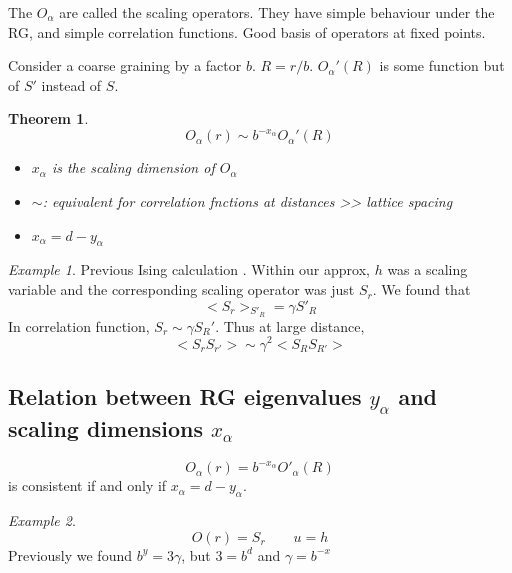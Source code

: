\documentclass[a4paper]{book}
\newtheorem{theorem}{Theorem}[section]
\theoremstyle{definition}
\theoremstyle{remark}
\newtheorem*{example}{Example}
\begin{document}
The $O_\alpha$ are called the scaling operators. They have simple behaviour under the RG, and simple correlation functions. Good basis of operators at fixed points. \par \medskip 

Consider a coarse graining by a factor $b$. $R = r/b$. $O_\alpha'(R)$ is some function but of $S'$ instead of $S$. 
\begin{theorem}
    \begin{equation}
        O_\alpha(r) \sim b^{-x_\alpha} O_\alpha'(R)
    \end{equation}
    \begin{itemize}
        \item $x_\alpha$ is the scaling dimension of $O_\alpha$
        \item $\sim$: equivalent for correlation fnctions at distances >> lattice spacing 
        \item $x_\alpha = d - y_\alpha$ 
    \end{itemize}
\end{theorem}
\begin{example}
    Previous Ising calculation . Within our approx, $h$ was a scaling variable and the corresponding scaling operator was just $S_r$. We found that 
    \begin{equation}
        <S_r>_{S'_R} = \gamma S'_R
    \end{equation}
    In correlation function, $S_r \sim \gamma S_R'$. Thus at large distance, 
    \begin{equation}
        <S_r S_{r'}> \sim \gamma^2 <S_R S_{R'}>
    \end{equation}
\end{example}

\subsection{Relation between RG eigenvalues $y_\alpha$ and scaling dimensions $x_\alpha$}
\begin{equation}
    O_\alpha(r) = b^{-x_\alpha}O'_\alpha(R)
\end{equation}
is consistent if and only if $x_\alpha = d-y_\alpha$. 
\begin{example}
    \begin{equation}
        O(r) = S_r\qquad u=h
    \end{equation}
    Previously we found $b^y = 3\gamma$, but $3 = b^d$ and $\gamma = b^{-x}$
\end{example}
\end{document}
